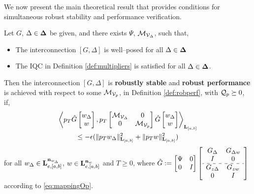 We now present the main theoretical result that provides conditions for simultaneous robust stability and performance verification.

\begin{theorem}\label{thm:metrics}
	Let $G$, $\Delta\in\mathbf{\Delta}$ be given, and there exists $\Psi$, $\mathcal{M}_{\mathcal{V}_\Delta}$, such that,
	\begin{itemize}
		\item The interconnection $[G,\Delta]$ is well--posed for all $\Delta\in\mathbf{\Delta}$
		\item The IQC in Definition \ref{def:multipliers} is satisfied for all $\Delta\in\mathbf{\Delta}$.
	\end{itemize}
	Then the interconnection $[G,\Delta]$ is \textbf{robustly stable} and \textbf{robust performance} is achieved with respect to some $\mathcal{M}_{{\mathcal{V}}_p}$, in Definition \ref{def:robperf}, with $\mathcal{Q}_p \succeq 0$, if,
	\begin{equation}\label{eq:rprs}
		\begin{gathered}
			\left\langle p_T\hat{G}\begin{bmatrix}w_\Delta\\w\end{bmatrix}, p_T\begin{bmatrix}\mathcal{M}_{\mathcal{V}_\Delta} & 0 \\ 0 & \mathcal{M}_{{\mathcal{V}}_p}\end{bmatrix}\hat{G}\begin{bmatrix}w_\Delta\\w\end{bmatrix} \right\rangle_{\mathbf{L}_{[a, b]}}\\ \leq -\epsilon (\|p_T{w_\Delta}\|^2_{\mathbf{L}_{[a, b]}}+\|p_T w\|^2_{\mathbf{L}_{[a,b]}})
		\end{gathered}
	\end{equation}
	for all $w_\Delta \in \mathbf{L}_{e,[a,b]}^{\mathbf{n}_{w_\Delta}}$, $w\in \mathbf{L}_{e,[a,b]}^{\mathbf{n}_{w}}$ and $T \geq 0$, where $\hat{G} := \bmat{\Psi & 0 \\ 0&  I}\left[\begin{array}{cc}
				G_\Delta & G_{\Delta w} \\ I & 0 \\ \hdashline G_{z\Delta} & G_{zw} \\ 0 & I
			\end{array}\right]$ according to \eqref{eq:mappingOp}.
\end{theorem}
